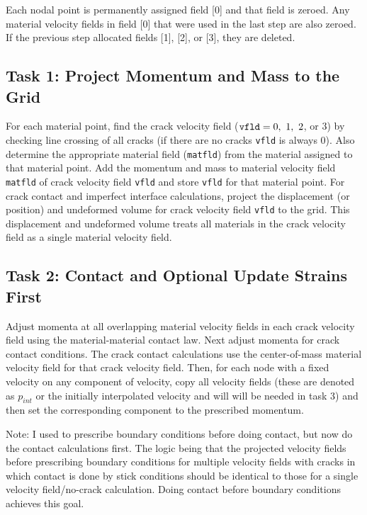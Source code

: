 \documentclass[11pt]{article}
\begin{document}
Each nodal point is permanently assigned field [0] and that field is zeroed. Any material velocity fields in field [0] that were used in the last step are also zeroed. If the previous step allocated fields [1], [2], or [3], they are deleted. 

\subsection{Task 1: Project Momentum and Mass to the Grid}

For each material point, find the crack velocity field (${\tt vfld}=0,\ 1,\ 2$, or $3$) by checking line crossing of all cracks (if there are no cracks {\tt vfld} is always 0). Also determine the appropriate material field ({\tt matfld}) from the material assigned to that material point. Add the momentum and mass to material velocity field {\tt matfld} of crack velocity field {\tt vfld} and store {\tt vfld} for that material point. For crack contact and imperfect interface calculations, project the displacement (or position) and undeformed volume for crack velocity field {\tt vfld} to the grid. This displacement and undeformed volume treats all materials in the crack velocity field as a single material velocity field.

\subsection{Task 2: Contact and Optional Update Strains First}

Adjust momenta at all overlapping material velocity fields in each crack velocity field using the material-material contact law. Next adjust momenta for crack contact conditions. The crack contact calculations use the center-of-mass material velocity field for that crack velocity field. Then, for each node with a fixed velocity on any component of velocity, copy all velocity fields (these are denoted as $p_{int}$ or the initially interpolated velocity and will will be needed in task 3) and then set the corresponding component to the prescribed momentum.

Note: I used to prescribe boundary conditions before doing contact, but now do the contact calculations first. The logic being that the projected velocity fields before prescribing boundary conditions for multiple velocity fields with cracks in which contact is done by stick conditions should be identical to those for a single velocity field/no-crack calculation. Doing contact before boundary conditions achieves this goal.
\end{document}
